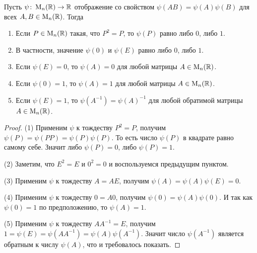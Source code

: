 \begin{claim}
Пусть $\psi\colon \operatorname{M}_{n}(\mathbb R)\to \mathbb R$ отображение со свойством $\psi(AB) = \psi(A)\psi(B)$ для всех $A,B\in\operatorname{M}_{n}(\mathbb R)$.
Тогда
\begin{enumerate}
\item Если $P\in \operatorname{M}_{n}(\mathbb R)$ такая, что $P^2 = P$, то $\psi(P)$ равно либо $0$, либо $1$.

\item В частности, значение $\psi(0)$ и $\psi(E)$ равно либо $0$, либо $1$.

\item Если $\psi(E) = 0$, то $\psi(A) = 0$ для любой матрицы $A\in\operatorname{M}_{n}(\mathbb R)$.

\item Если $\psi(0) = 1$, то $\psi(A) = 1$ для любой матрицы $A\in\operatorname{M}_{n}(\mathbb R)$.

\item Если $\psi(E) = 1$, то $\psi(A^{-1}) = \psi(A)^{-1}$ для любой обратимой матрицы $A\in\operatorname{M}_{n}(\mathbb R)$.
\end{enumerate}
\end{claim}
\begin{proof}

(1) Применим $\psi$ к тождеству $P^2 = P$, получим $\psi(P) = \psi(P P) = \psi(P)\psi(P)$.
То есть число $\psi(P)$ в квадрате равно самому себе.
Значит либо $\psi(P) = 0$, либо $\psi(P) = 1$.

(2) Заметим, что $E^2 = E$ и $0^2 = 0$ и воспользуемся предыдущим пунктом.

(3) Применим $\psi$ к тождеству $A = A E$, получим $\psi(A) = \psi(A)\psi(E) = 0$.

(4) Применим $\psi$ к тождеству $0 = A 0$, получим $\psi(0) = \psi(A) \psi(0)$.
И так как $\psi(0) =1$ по предположению, то $\psi(A) = 1$.

(5) Применим $\psi$ к тождеству $A A^{-1} = E$, получим $1 = \psi(E) = \psi(AA^{-1})=\psi(A)\psi(A^{-1})$.
Значит число $\psi(A^{-1})$ является обратным к числу $\psi(A)$, что и требовалось показать.
\end{proof}

